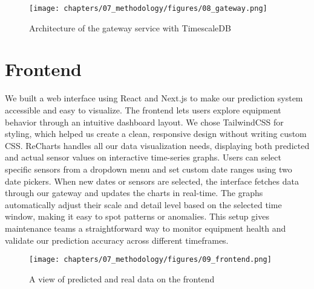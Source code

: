 \begin{figure}[H]
    \centering
    \texttt{[image: chapters/07\_methodology/figures/08\_gateway.png]}
    \caption{Architecture of the gateway service with TimescaleDB}
\end{figure}

\section{Frontend}
We built a web interface using React and Next.js to make our prediction system accessible and easy to visualize. The frontend lets users explore equipment behavior through an intuitive dashboard layout. We chose TailwindCSS for styling, which helped us create a clean, responsive design without writing custom CSS. ReCharts handles all our data visualization needs, displaying both predicted and actual sensor values on interactive time-series graphs. Users can select specific sensors from a dropdown menu and set custom date ranges using two date pickers. When new dates or sensors are selected, the interface fetches data through our gateway and updates the charts in real-time. The graphs automatically adjust their scale and detail level based on the selected time window, making it easy to spot patterns or anomalies. This setup gives maintenance teams a straightforward way to monitor equipment health and validate our prediction accuracy across different timeframes.

\begin{figure}
    \centering
    \texttt{[image: chapters/07\_methodology/figures/09\_frontend.png]}
    \caption{A view of predicted and real data on the frontend}
    \label{fig:enter-label}
\end{figure}